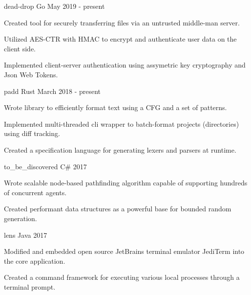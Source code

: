 
\begin{cventries}
  
   {dead-drop} {Go} {May 2019
    - present} {
    \begin{cvitems}
    \item Created tool for securely transferring files via an untrusted
      middle-man server.
    \item Utilized AES-CTR with HMAC to encrypt and authenticate user data on
      the client side.
    \item Implemented client-server authentication using assymetric key
      cryptography and Json Web Tokens.
    \end{cvitems}
  }
  
   {padd}
  {Rust} {March 2018 - present} {
    \begin{cvitems}
    \item Wrote library to efficiently format text using a CFG and a set of
      patterns.
    \item Implemented multi-threaded cli wrapper to batch-format projects
      (directories) using diff tracking.
    \item Created a specification language for generating lexers and parsers at
      runtime.
    \end{cvitems}
  }
  
  {to\_be\_discovered} {C\#} {2017} {
    \begin{cvitems}
    \item Wrote scalable node-based pathfinding algorithm capable of supporting
      hundreds of concurrent agents.
    \item Created performant data structures as a powerful base for bounded
      random generation.
    \end{cvitems}
  }
  
   {lens} {Java}
  {2017} {
    \begin{cvitems}
    \item Modified and embedded open source JetBrains terminal emulator JediTerm
      into the core application.
    \item Created a command framework for executing various local processes
      through a terminal prompt.
    \end{cvitems}
  }
  

\end{cventries}
